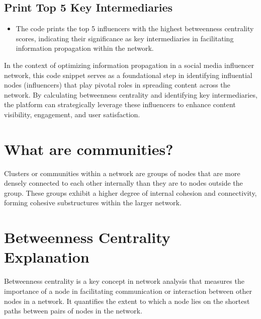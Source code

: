 \documentclass{article}
\begin{document}
\subsection{Print Top 5 Key Intermediaries}
\begin{itemize}
    \item The code prints the top 5 influencers with the highest betweenness centrality scores, indicating their significance as key intermediaries in facilitating information propagation within the network.
\end{itemize}

In the context of optimizing information propagation in a social media influencer network, this code snippet serves as a foundational step in identifying influential nodes (influencers) that play pivotal roles in spreading content across the network. By calculating betweenness centrality and identifying key intermediaries, the platform can strategically leverage these influencers to enhance content visibility, engagement, and user satisfaction.

\section{What are communities?}
Clusters or communities within a network are groups of nodes that are more densely connected to each other internally than they are to nodes outside the group. These groups exhibit a higher degree of internal cohesion and connectivity, forming cohesive substructures within the larger network.

\section{Betweenness Centrality Explanation}
Betweenness centrality is a key concept in network analysis that measures the importance of a node in facilitating communication or interaction between other nodes in a network. It quantifies the extent to which a node lies on the shortest paths between pairs of nodes in the network.
\end{document}
